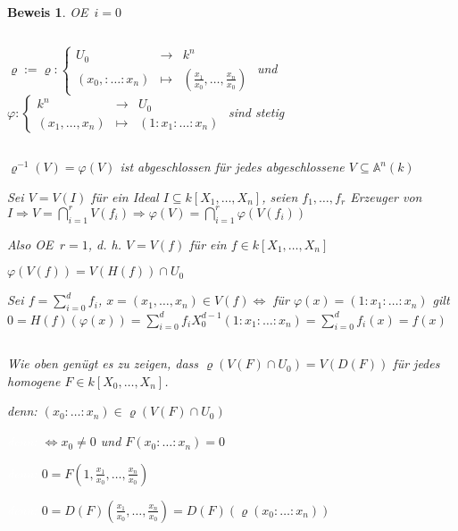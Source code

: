 \documentclass[a4paper, 12pt, numbers=noendperiod, chapterprefix=true, headsepline]{scrbook}
\theoremstyle{break}
\theoremstyle{nonumberbreak}
\newtheorem{Bew}{Beweis}
\theoremstyle{nonumberplain}
\newcommand{\A}{\mathbb{A}}
\renewcommand{\OE}{O\!\!E~}
\begin{document}
\begin{Bew}
\OE $i=0$\begin{description}[\setlabelstyle{\itshape}]
\item[Zeige:]$\ $%

	$\varrho:=\varrho: \left\{\begin{array}{rcl}U_0&\to&k^n\\(x_0,:\ldots :x_n)&\mapsto&(\frac{x_1}{x_0},\ldots ,\frac{x_n}{x_0})\end{array}\right.$ und $\varphi: \left\{\begin{array}{rcl}k^n&\to&U_0\\(x_1,\ldots ,x_n)&\mapsto&(1:x_1:\ldots :x_n)\end{array}\right.$ sind stetig

\item[$\varrho$ stetig:]$\ $
	\begin{description}[\setlabelstyle{\itshape}]
	\item[Zeige:] $\varrho^{-1}(V)=\varphi(V)$ ist abgeschlossen f\"ur jedes abgeschlossene $V\subseteq\A^n(k)$
	\end{description}
	Sei $V=V(I)$ f\"ur ein Ideal $I\subseteq k[X_1,\ldots ,X_n]$, seien $f_1,\ldots ,f_r$ Erzeuger von $I \Rightarrow V=\bigcap\limits_{i=1}^rV(f_i)\Rightarrow \varphi(V)=\bigcap\limits_{i=1}^r\varphi(V(f_i))$
	
	Also \OE $r=1$, d. h. $V=V(f)$ f\"ur ein $f\in k[X_1,\ldots ,X_n]$
	
	\begin{description}[\setlabelstyle{\itshape}]
	\item[Behauptung:] $\varphi(V(f))=V(H(f))\cap U_0$
	\item[denn:] Sei $f=\sum_{i=0}^df_i$, $x=(x_1,\ldots ,x_n)\in V(f)\Leftrightarrow$ f\"ur $\varphi(x)=(1:x_1:\ldots:x_n)$ gilt $0=H(f)(\varphi(x))=\sum_{i=0}^df_iX_0^{d-1}(1:x_1:\ldots :x_n)=\sum_{i=0}^df_i(x)=f(x)$
	\end{description}

\item[$\varphi$ stetig:]$\ $

	Wie oben gen\"ugt es zu zeigen, dass $\varrho(V(F)\cap U_0)=V(D(F))$ f\"ur jedes homogene $F\in k[X_0,\ldots ,X_n]$.
	
	\emph{denn:} $(x_0:\ldots :x_n)\in \varrho(V(F)\cap U_0)$
	
	\textcolor{white}{\emph{denn:}} $\Leftrightarrow x_0\not=0$ und $F(x_0:\ldots :x_n)=0$
	
	\textcolor{white}{\emph{denn:}} $0=F(1,\frac{x_1}{x_0},\ldots ,\frac{x_n}{x_0})$
	
	\textcolor{white}{\emph{denn:}} $0=D(F)(\frac{x_1}{x_0},\ldots ,\frac{x_n}{x_0})= D(F)(\varrho(x_0:\ldots :x_n))$
\end{description}\end{Bew}
\end{document}
